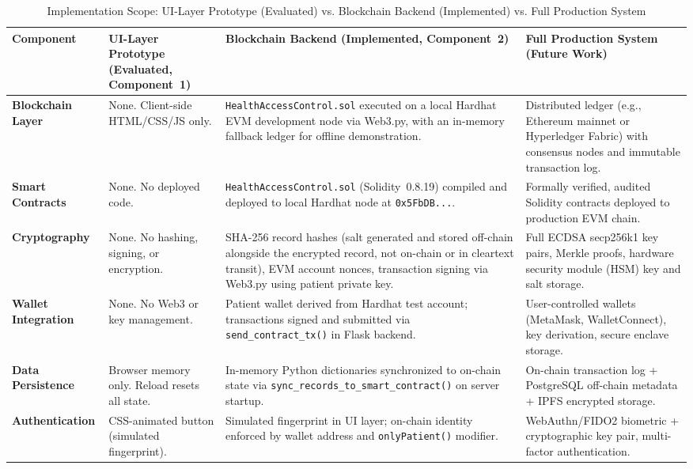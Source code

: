 \documentclass[journal,onecolumn]{IEEEtran}
\begin{document}
\begin{table}[htbp]
\centering
\small
\caption{Implementation Scope: UI-Layer Prototype (Evaluated) vs. Blockchain Backend (Implemented) vs. Full Production System}
\label{tab:prototype-vs-full}
\begin{adjustbox}{max width=\columnwidth}
\begin{tabular}{|p{2.8cm}|p{3.8cm}|p{3.8cm}|p{3.8cm}|}
\hline
\textbf{Component} & \textbf{UI-Layer Prototype (Evaluated, Component~1)} & \textbf{Blockchain Backend (Implemented, Component~2)} & \textbf{Full Production System (Future Work)} \\
\hline
\textbf{Blockchain Layer} & None. Client-side HTML/CSS/JS only. & \texttt{HealthAccessControl.sol} executed on a local Hardhat EVM development node via Web3.py, with an in-memory fallback ledger for offline demonstration. & Distributed ledger (e.g., Ethereum mainnet or Hyperledger Fabric) with consensus nodes and immutable transaction log. \\
\hline
\textbf{Smart Contracts} & None. No deployed code. & \texttt{HealthAccessControl.sol} (Solidity~0.8.19) compiled and deployed to local Hardhat node at \texttt{0x5FbDB...}. & Formally verified, audited Solidity contracts deployed to production EVM chain. \\
\hline
\textbf{Cryptography} & None. No hashing, signing, or encryption. & SHA-256 record hashes (salt generated and stored off-chain alongside the encrypted record, not on-chain or in cleartext transit), EVM account nonces, transaction signing via Web3.py using patient private key. & Full ECDSA secp256k1 key pairs, Merkle proofs, hardware security module (HSM) key and salt storage. \\
\hline
\textbf{Wallet Integration} & None. No Web3 or key management. & Patient wallet derived from Hardhat test account; transactions signed and submitted via \texttt{send\_contract\_tx()} in Flask backend. & User-controlled wallets (MetaMask, WalletConnect), key derivation, secure enclave storage. \\
\hline
\textbf{Data Persistence} & Browser memory only. Reload resets all state. & In-memory Python dictionaries synchronized to on-chain state via \texttt{sync\_records\_to\_\allowbreak smart\_contract()} on server startup. & On-chain transaction log + PostgreSQL off-chain metadata + IPFS encrypted storage. \\
\hline
\textbf{Authentication} & CSS-animated button (simulated fingerprint). & Simulated fingerprint in UI layer; on-chain identity enforced by wallet address and \texttt{onlyPatient()} modifier. & WebAuthn/FIDO2 biometric + cryptographic key pair, multi-factor authentication. \\

\end{tabular}
\end{adjustbox}
\end{table}
\end{document}
